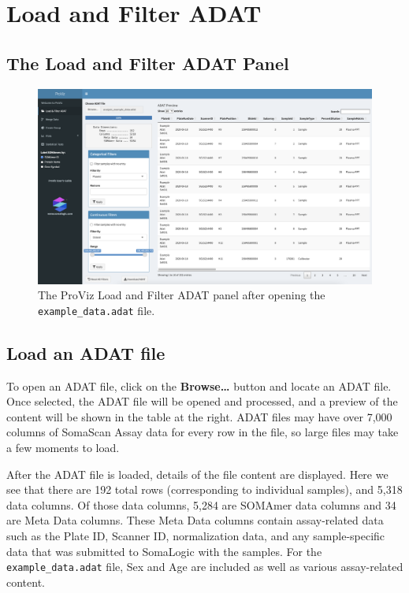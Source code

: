 \documentclass[
]{book}
\begin{document}
\hypertarget{load-and-filter-adat}{%
\chapter{Load and Filter ADAT}\label{load-and-filter-adat}}

\hypertarget{the-load-and-filter-adat-panel}{%
\section{The Load and Filter ADAT Panel}\label{the-load-and-filter-adat-panel}}

\begin{figure}
\centering
\includegraphics{images/LoadAndFilter.png}
\caption{The ProViz Load and Filter ADAT panel after opening the \texttt{example\_data.adat} file.}
\end{figure}

\hypertarget{load-an-adat-file}{%
\section{Load an ADAT file}\label{load-an-adat-file}}

To open an ADAT file, click on the \textbf{Browse\ldots{}} button and locate an ADAT file. Once selected, the ADAT file will be opened and processed, and a preview of the content will be shown in the table at the right. ADAT files may have over 7,000 columns of SomaScan Assay data for every row in the file, so large files may take a few moments to load.

After the ADAT file is loaded, details of the file content are displayed. Here we see that there are 192 total rows (corresponding to individual samples), and 5,318 data columns. Of those data columns, 5,284 are SOMAmer data columns and 34 are Meta Data columns. These Meta Data columns contain assay-related data such as the Plate ID, Scanner ID, normalization data, and any sample-specific data that was submitted to SomaLogic with the samples. For the \texttt{example\_data.adat} file, Sex and Age are included as well as various assay-related content.
\end{document}
